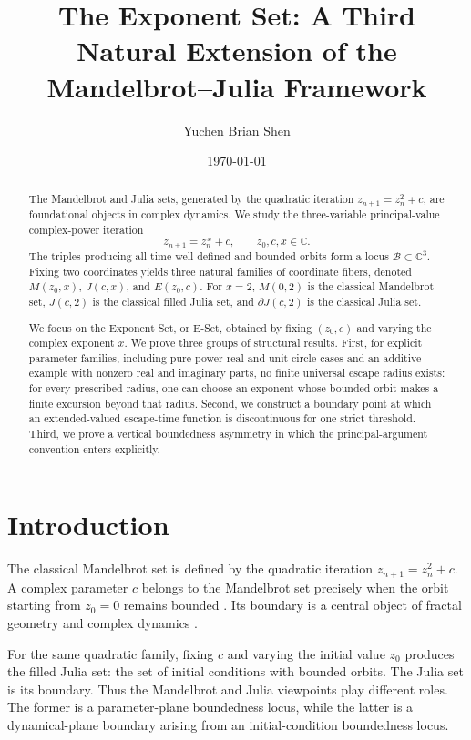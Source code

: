 \documentclass[12pt,a4paper]{amsart}
\title[The Exponent Set]{The Exponent Set: A Third Natural Extension of the Mandelbrot--Julia Framework}
\author{Yuchen Brian Shen}
\date{\today}
\theoremstyle{remark}
\newcommand{\C}{\mathbb{C}}
\begin{document}
\raggedbottom 


\begin{abstract}
The Mandelbrot and Julia sets, generated by the quadratic iteration
\(z_{n+1}=z_n^2+c\), are foundational objects in complex
dynamics. We study the three-variable principal-value complex-power iteration
\[
z_{n+1}=z_n^{\,x}+c,
\qquad z_0,c,x\in\C.
\]
The triples producing all-time well-defined and bounded orbits form a locus
\(\mathcal{B}\subset\C^3\). Fixing two coordinates yields three natural
families of coordinate fibers, denoted \(M(z_0,x)\), \(J(c,x)\), and
\(E(z_0,c)\). For \(x=2\), \(M(0,2)\) is the classical
Mandelbrot set, \(J(c,2)\) is the classical filled Julia set, and
\(\partial J(c,2)\) is the classical Julia set.

We focus on the Exponent Set, or E-Set, obtained by fixing $(z_0,c)$ and
varying the complex exponent $x$. We prove three groups of structural results.
First, for explicit parameter families, including pure-power real and
unit-circle cases and an additive example with nonzero real and imaginary
parts, no finite universal escape radius exists: for every prescribed radius,
one can choose an exponent whose bounded orbit makes a finite excursion beyond
that radius. Second, we construct a boundary point at which an
extended-valued escape-time function is discontinuous for one strict threshold.
Third, we prove a vertical boundedness asymmetry in which the
principal-argument convention enters explicitly.
\end{abstract}

\maketitle

\section{Introduction}

The classical Mandelbrot set is defined by the quadratic iteration
$z_{n+1}=z_n^2+c$. A complex parameter $c$ belongs to the Mandelbrot set
precisely when the orbit starting from $z_0=0$ remains bounded
\cite{mandelbrot1982fractal}. Its boundary is a central object of fractal
geometry and complex dynamics \cite{falconer2003fractal}.

For the same quadratic family, fixing $c$ and varying the initial value $z_0$
produces the filled Julia set: the set of initial conditions with bounded
orbits. The Julia set is its boundary. Thus the Mandelbrot and Julia viewpoints
play different roles. The former is a parameter-plane boundedness locus, while
the latter is a dynamical-plane boundary arising from an initial-condition
boundedness locus.
\end{document}
